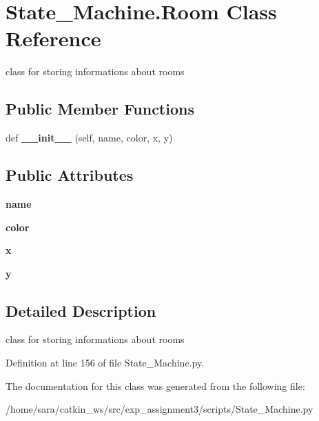 \hypertarget{classState__Machine_1_1Room}{}\section{State\+\_\+\+Machine.\+Room Class Reference}
\label{classState__Machine_1_1Room}


class for storing informations about rooms  


\subsection*{Public Member Functions}
\begin{DoxyCompactItemize}
\item 
\mbox{\label{classState__Machine_1_1Room_a65464d35fe951e0f35c4b2a501737439}} 
def {\bfseries \+\_\+\+\_\+init\+\_\+\+\_\+} (self, name, color, x, y)
\end{DoxyCompactItemize}
\subsection*{Public Attributes}
\begin{DoxyCompactItemize}
\item 
\mbox{\label{classState__Machine_1_1Room_a3d30652341706ded27318643458d4da6}} 
{\bfseries name}
\item 
\mbox{\label{classState__Machine_1_1Room_a9b4b6bb5ab572dbd3a86d2ce593fa9d7}} 
{\bfseries color}
\item 
\mbox{\label{classState__Machine_1_1Room_a27daffab86b6888691583c7ae21dd76f}} 
{\bfseries x}
\item 
\mbox{\label{classState__Machine_1_1Room_a05d9a05c6f4c72b6d0e6af24f6ce4fb4}} 
{\bfseries y}
\end{DoxyCompactItemize}


\subsection{Detailed Description}
class for storing informations about rooms 

Definition at line 156 of file State\+\_\+\+Machine.\+py.



The documentation for this class was generated from the following file\+:\begin{DoxyCompactItemize}
\item 
/home/sara/catkin\+\_\+ws/src/exp\+\_\+assignment3/scripts/State\+\_\+\+Machine.\+py\end{DoxyCompactItemize}
